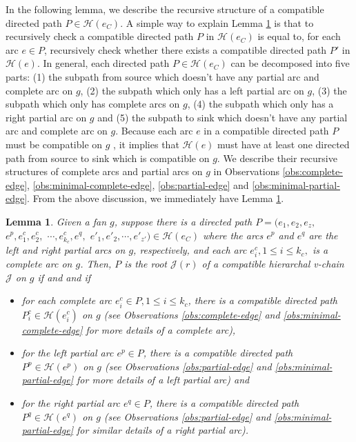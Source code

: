 \documentclass[11pt]{article}
\newcommand{\HH}{\mathcal{H}}
\newcommand{\JJ}{\mathcal{J}}
\newtheorem{lemma}[figure]{Lemma}
\begin{document}
In the following lemma,
we describe the recursive structure of a compatible directed path $P\in \HH(e_C)$.
A simple way to explain Lemma \ref{lemma:proper-chain} is that
to recursively check a compatible directed path $P$ in $\HH(e_C)$
is equal to,
for each arc $e\in P$,
recursively check whether there exists a compatible directed path $P'$ in $\HH(e)$.
In general, each directed path $P\in \HH(e_C)$ can be decomposed into five parts:
(1) the subpath from source which doesn't have any partial arc and complete arc on $g$,
(2) the subpath which only has a left partial arc on $g$,
(3) the subpath which only has complete arcs on $g$,
(4) the subpath which only has a right partial arc on $g$ and
(5) the subpath to sink which doesn't have any partial arc and complete arc on $g$.
Because each arc $e$ in a compatible directed path $P$
must be compatible on $g$ ,
it implies that
$\HH(e)$ must have at least one directed path from source to sink which is compatible on $g$.
We describe their recursive structures of complete arcs and partial arcs on $g$ in Observations
\ref{obs:complete-edge}, \ref{obs:minimal-complete-edge}, \ref{obs:partial-edge} and \ref{obs:minimal-partial-edge}.
From the above discussion, we immediately have Lemma \ref{lemma:proper-chain}.

\begin{lemma}\label{lemma:proper-chain}
Given a fan $g$,
suppose there is a directed path
$P=(e_1, e_2, e_z,$ $e^p, e^c_1, e^c_2,$ $\cdots, e^c_{k_c}, e^q,$
$e'_1, e'_2, \cdots, e'_{z'}) \in \HH(e_C)$
where the arcs $e^p$ and $e^q$ are the left and right partial arcs on $g$, respectively, and
each arc $e^c_i, 1\leq i\leq k_c,$ is a complete arc on $g$.
Then, $P$ is the root $\JJ(r)$ of a compatible hierarchal v-chain $\JJ$ on $g$ if and and if
\begin{itemize}
\item for each complete arc $e^c_i\in P, 1\leq i\leq k_c$,
there is a compatible directed path $P^c_i\in \HH(e^c_i)$ on $g$
(see Observations \ref{obs:complete-edge} and \ref{obs:minimal-complete-edge}
for more details of a complete arc),
\item for the left partial arc $e^p\in P$,
there is a compatible directed path $P^p\in \HH(e^p)$ on $g$
(see Observations \ref{obs:partial-edge} and \ref{obs:minimal-partial-edge}
for more details of a left partial arc) and
\item for the right partial arc $e^q\in P$,
there is a compatible directed path $P^q\in \HH(e^q)$ on $g$
(see Observations \ref{obs:partial-edge} and \ref{obs:minimal-partial-edge}
for similar details of a right partial arc).
\end{itemize}
\end{lemma}
\end{document}
